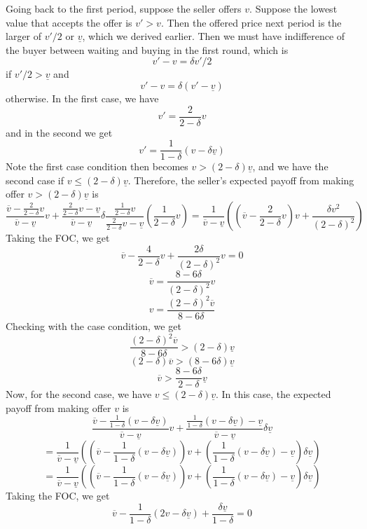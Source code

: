 \documentclass[10pt,letter]{article}
\begin{document}
\begin{enumerate}[label=(\alph*)]
Going back to the first period, suppose the seller offers $v$. Suppose the lowest value that accepts the offer is $v' > v$. Then the offered price next period is the larger of $v'/2$ or $\underline{v}$, which we derived earlier. Then we must have indifference of the buyer between waiting and buying in the first round, which is
\[ v' - v = \delta v'/2 \]
if $v'/2 > \underline{v}$ and
\[ v'- v = \delta (v' - \underline{v}) \]
otherwise. In the first case, we have
\[ v' = \frac{2}{2-\delta}v \]
and in the second we get
\[ v' = \frac{1}{1-\delta}(v - \delta \underline{v}) \]
Note the first case condition then becomes $v > (2-\delta) \underline{v}$, and we have the second case if $v \le (2-\delta)\underline{v}$. Therefore, the seller's  expected payoff from making offer $v > (2-\delta)\underline{v}$ is
\[ \frac{\overline{v} - \frac{2}{2-\delta}v}{\overline{v} - \underline{v}}v + \frac{\frac{2}{2-\delta}v - \underline{v}}{\overline{v} - \underline{v}}\delta\frac{\frac{1}{2-\delta}v}{\frac{2}{2-\delta}v - \underline{v}}\left(\frac{1}{2-\delta}v\right) = \frac{1}{\overline{v} - \underline{v}} \left(\left(\overline{v} - \frac{2}{2-\delta}v \right)v + \frac{\delta v^2}{(2-\delta)^2} \right)  \]
Taking the FOC, we get
\[ \overline{v} - \frac{4}{2-\delta}v + \frac{2\delta}{(2-\delta)^2}v = 0 \]
\[ \overline{v}  = \frac{8 - 6 \delta}{(2-\delta)^2}v \]
\[ v = \frac{(2-\delta)^2 \overline{v} }{8 - 6 \delta} \]
Checking with the case condition, we get
\[ \frac{(2-\delta)^2 \overline{v} }{8 - 6 \delta} > (2-\delta)\underline{v}\]
\[ (2-\delta) \overline{v} > (8 - 6\delta)\underline{v}\]
\[ \overline{v} >\frac{8 - 6\delta}{2-\delta}\underline{v}\]
Now, for the second case, we have $v \le (2-\delta) \underline{v}$. In this case, the expected payoff from making offer $v$ is
\[ \frac{\overline{v} - \frac{1}{1-\delta}(v - \delta \underline{v})}{\overline{v} - \underline{v}}v + \frac{\frac{1}{1-\delta}(v - \delta \underline{v}) - \underline{v}}{\overline{v} - \underline{v}}\delta\underline{v}  \]
\[ = \frac{1}{\overline{v} - \underline{v}}\left(\left(\overline{v} - \frac{1}{1-\delta}(v - \delta \underline{v}) \right)v + \left(\frac{1}{1-\delta}(v - \delta \underline{v}) - \underline{v} \right) \delta \underline{v}  \right) \]
\[ = \frac{1}{\overline{v} - \underline{v}}\left(\left(\overline{v} - \frac{1}{1-\delta}(v - \delta \underline{v}) \right)v + \left(\frac{1}{1-\delta}(v - \delta \underline{v}) - \underline{v} \right) \delta \underline{v}  \right) \]
Taking the FOC, we get
\[ \overline{v} - \frac{1}{1-\delta}(2v - \delta \underline{v}) + \frac{\delta\underline{v}}{1-\delta} = 0 \]

\end{enumerate}
\end{document}
